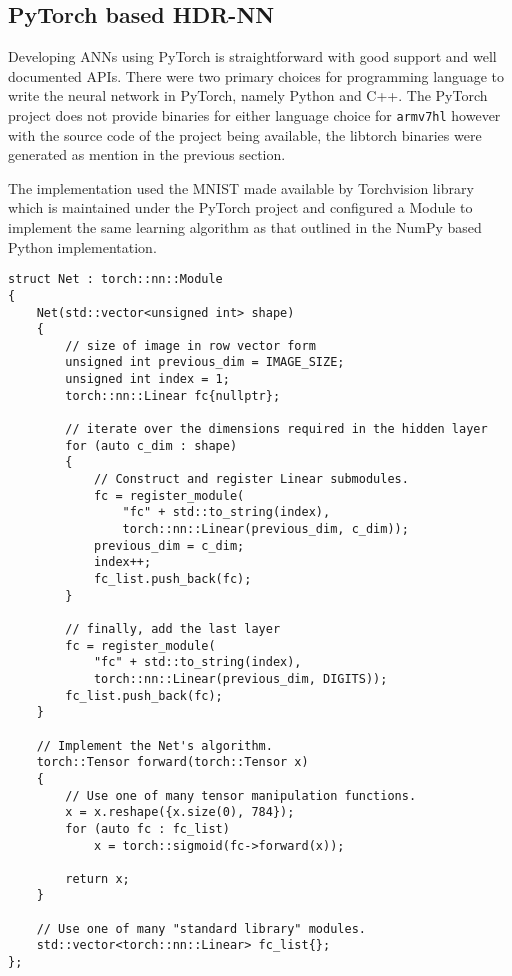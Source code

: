 

\subsection{PyTorch based HDR-NN}

Developing ANNs using PyTorch is straightforward with good support and well documented APIs. There were two primary choices for programming language to write the neural network in PyTorch, namely Python and C++. The PyTorch project does not provide binaries for either language choice for \texttt{armv7hl} however with the source code of the project being available, the libtorch binaries were generated as mention in the previous section.

The implementation used the MNIST made available by Torchvision library which is maintained under the PyTorch project and configured a Module to implement the same learning algorithm as that outlined in the NumPy based Python implementation.

\begin{verbatim}
struct Net : torch::nn::Module
{
	Net(std::vector<unsigned int> shape)
	{
		// size of image in row vector form
		unsigned int previous_dim = IMAGE_SIZE;
		unsigned int index = 1;
		torch::nn::Linear fc{nullptr};

		// iterate over the dimensions required in the hidden layer
		for (auto c_dim : shape)
		{
			// Construct and register Linear submodules.
			fc = register_module(
				"fc" + std::to_string(index),
				torch::nn::Linear(previous_dim, c_dim));
			previous_dim = c_dim;
			index++;
			fc_list.push_back(fc);
		}

		// finally, add the last layer
		fc = register_module(
			"fc" + std::to_string(index),
			torch::nn::Linear(previous_dim, DIGITS));
		fc_list.push_back(fc);
	}

	// Implement the Net's algorithm.
	torch::Tensor forward(torch::Tensor x)
	{
		// Use one of many tensor manipulation functions.
		x = x.reshape({x.size(0), 784});
		for (auto fc : fc_list)
			x = torch::sigmoid(fc->forward(x));

		return x;
	}

	// Use one of many "standard library" modules.
	std::vector<torch::nn::Linear> fc_list{};
};
\end{verbatim}


